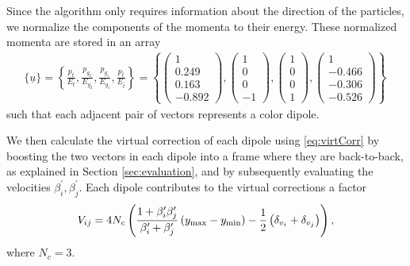 \documentclass[11pt,a4paper]{article}
\begin{document}
Since the algorithm only requires information about the direction of the particles, we normalize the components of the momenta to their energy. These normalized momenta are stored in an array
\begin{align}
\{ \underline{u} \} =\left\{ \frac{p_t}{E_t},\frac{p_{g_2}}{E_{g_2}},\frac{p_{g_1}}{E_{g_1}},\frac{p_{\bar{t}}}{E_{\bar{t}}}\right\}=\left\{\left(\begin{matrix} 1\\0.249\\ 0.163\\-0.892\end{matrix}\right),\left(\begin{matrix} 1\\0\\ 0\\-1\end{matrix}\right),\left(\begin{matrix} 1\\0\\ 0\\1\end{matrix}\right),\left(\begin{matrix} 1\\-0.466\\ -0.306\\ -0.526\end{matrix}\right)\right\}\,  \label{eq:eventlist}
\end{align}
such that each adjacent pair of vectors represents a color dipole.


We then calculate the virtual correction of each dipole using \eqref{eq:virtCorr} by boosting the 
two vectors in each dipole into a frame where they are back-to-back, as explained in  Section \ref{sec:evaluation},
and by subsequently evaluating the velocities $\beta_i^\prime,\beta_j^\prime$. Each dipole contributes to the virtual corrections a factor 
\begin{align} \label{eq:app_Vij}
V_{ij}= 4 N_c \left(
\frac{1 + \beta^\prime_i \beta^\prime_{j}}{\beta^\prime_i + \beta^\prime_{j} }\left(y_{\rm max}-y_{\rm min}\right) -\frac{1}{2}\left(\delta_{v_i}+\delta_{v_{j}}\right)\right) ,
\end{align}
where  $N_c=3$.
\end{document}

